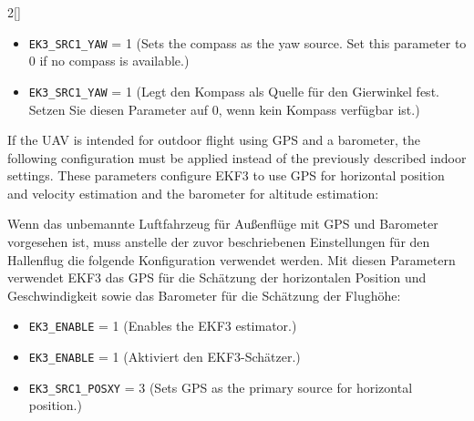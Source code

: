 \begin{paracol}{2}[]
\coleng

\begin{itemize}
\item \verb!EK3_SRC1_YAW! = 1 \quad (Sets the compass as the yaw source. Set this parameter to 0 if no compass is available.)
\end{itemize}

\colger

\begin{itemize}
\item \verb!EK3_SRC1_YAW! = 1 \quad (Legt den Kompass als Quelle für den Gierwinkel fest. Setzen Sie diesen Parameter auf 0, wenn kein Kompass verfügbar ist.)
\end{itemize}

\colende

\renewcommand{\deutschertitel}{ArduPilot für den Außenflug mit Begleitcomputer, GPS und Barometer}
\renewcommand{\englischertitel}{ArduPilot for Outdoor Flight with a Companion Computer, GPS, and a Barometer}
\makrounterabschnitt

If the UAV is intended for outdoor flight using GPS and a barometer, the following configuration must be applied instead of the previously described indoor settings. These parameters configure EKF3 to use GPS for horizontal position and velocity estimation and the barometer for altitude estimation:

\colger

Wenn das unbemannte Luftfahrzeug für Außenflüge mit GPS und Barometer vorgesehen ist, muss anstelle der zuvor beschriebenen Einstellungen für den Hallenflug die folgende Konfiguration verwendet werden. Mit diesen Parametern verwendet EKF3 das GPS für die Schätzung der horizontalen Position und Geschwindigkeit sowie das Barometer für die Schätzung der Flughöhe:

\coleng

\begin{itemize}
\item \verb!EK3_ENABLE! = 1 \quad (Enables the EKF3 estimator.)
\end{itemize}

\colger

\begin{itemize}
\item \verb!EK3_ENABLE! = 1 \quad (Aktiviert den EKF3-Schätzer.)
\end{itemize}

\coleng

\begin{itemize}
\item \verb!EK3_SRC1_POSXY! = 3 \quad (Sets GPS as the primary source for horizontal position.)
\end{itemize}


\end{paracol}
